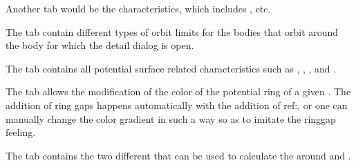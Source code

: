 \documentclass[letterpaper,10pt,english]{sphinxmanual}
\begin{document}
\sphinxAtStartPar
Another tab would be the {\hyperref[\detokenize{quantities/orbital/orbital:id1}]{}} characteristics, which includes
{\hyperref[\detokenize{quantities/orbital/eccentricity:id1}]{}}, {\hyperref[\detokenize{quantities/orbital/semi_major_axis:id1}]{}} etc.

\sphinxAtStartPar
The {\hyperref[\detokenize{quantities/children_orbit_limits/children_orbit_limits:id1}]{}} tab contain different types of orbit
limits for the bodies that orbit around the body for which the detail dialog is open.

\sphinxAtStartPar
The {\hyperref[\detokenize{quantities/surface/surface:id1}]{}} tab contains all potential surface related
characteristics such as {\hyperref[\detokenize{quantities/surface/emission/temperature:id1}]{}}, {\hyperref[\detokenize{quantities/surface/gravity/surface_gravity:id1}]{}},
{\hyperref[\detokenize{quantities/surface/angular_diameter:id1}]{}}, and {\hyperref[\detokenize{quantities/surface/internal_heating/tectonic_activity:id1}]{}}.

\sphinxAtStartPar
The {\hyperref[\detokenize{celestial_bodies/ring:id1}]{}} tab allows the modification of the color of the potential ring of
a given {\hyperref[\detokenize{celestial_bodies/planet:id1}]{}}. The addition of ring gaps happens automatically
with the addition of ref:, or one can manually change the color gradient
in such a way so as to imitate the ring\sphinxhyphen{}gap feeling.

\sphinxAtStartPar
The {\hyperref[\detokenize{quantities/insolation_models/insolation_models:id1}]{}} tab contains the two different {\hyperref[\detokenize{quantities/insolation_models/insolation_models:id1}]{}}
that can be used to calculate the {\hyperref[\detokenize{quantities/habitability/habitable_zones/habitable_zones:id1}]{}} around
{\hyperref[\detokenize{celestial_bodies/star:id1}]{}} and {\hyperref[\detokenize{celestial_systems/binary_system:id1}]{}}.
\end{document}
